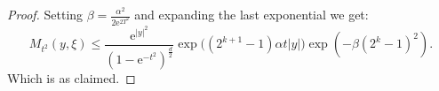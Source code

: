 \documentclass[a4paper,oneside,10pt]{amsproc}
\theoremstyle{remark}
\renewcommand{\leq}{\leqslant}
\renewcommand{\leq}{\leqslant}
\newcommand{\e}{\mathrm{e}} %
\renewcommand{\leq}{\leqslant}%
\begin{document}
\begin{proof}
  Setting $\beta = \frac{\alpha^2}{2 \e^{2T^2}}$ and expanding the last
  exponential we get:
  \begin{equation*}
    M_{t^2}(y, \xi) \leq \frac{\e^{|y|^2}}{(1 - \e^{-{t^2}})^{\frac{d}2}}
    \exp\bigl((2^{k + 1} - 1) \alpha t |y| \bigr)
    \exp(- \beta (2^k - 1)^2 ).
  \end{equation*}
  Which is as claimed.
\end{proof}
\end{document}
